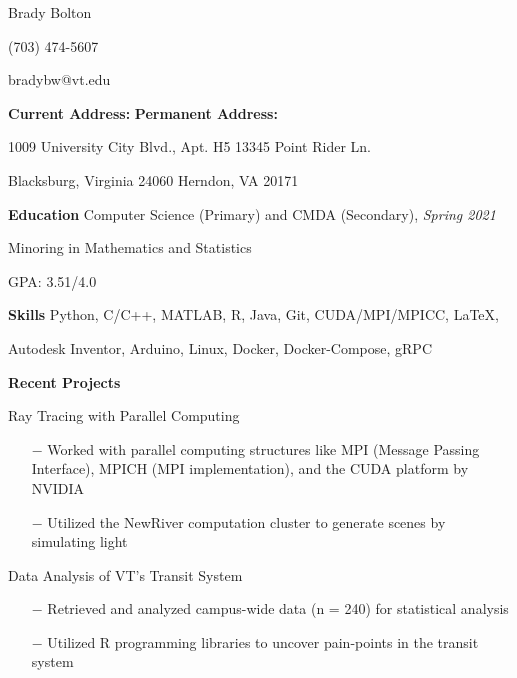 \documentclass{article}
\begin{document}
	\begin{center}
	
		\huge{Brady Bolton}
		
		\large{(703) 474-5607}
		
		\large{bradybw@vt.edu}
	
	\end{center}

\textbf{Current Address:} \hfill \textbf{Permanent Address:}

1009 University City Blvd., Apt. H5 \hfill 13345 Point Rider Ln.

Blacksburg, Virginia 24060 \hfill Herndon, VA 20171

\vline

\textbf{\large{Education}} \quad Computer Science (Primary) and CMDA (Secondary), \textit{Spring 2021}

\qquad \qquad \qquad \hspace{10pt} Minoring in Mathematics and Statistics

\qquad \qquad \qquad \hspace{10pt} GPA: 3.51/4.0

\vline

\textbf{\large{Skills}} \qquad \qquad Python, C/C++, MATLAB, R, Java, Git, CUDA/MPI/MPICC, \LaTeX, 

\qquad \qquad \qquad \hspace{10pt} Autodesk Inventor, Arduino, Linux, Docker, Docker-Compose, gRPC

\vline

\textbf{\large{Recent Projects}} 

\vspace{5pt}

{\setlength{\leftskip}{15pt}
	{\selectfont Ray Tracing with Parallel Computing}
	\vspace{-5pt}
	\begin{itemize}
		\setlength{\leftskip}{15pt}
		\setlength\itemsep{-0.5em}
		\item[$-$] Worked with parallel computing structures like MPI (Message Passing Interface), MPICH (MPI implementation), and the CUDA platform by NVIDIA
		\item[$-$] Utilized the NewRiver computation cluster to generate scenes by simulating light
	\end{itemize}
	
	{\selectfont Data Analysis of VT’s Transit System}
	\vspace{-5pt}
	\begin{itemize}
		\setlength{\leftskip}{15pt}
		\setlength\itemsep{-0.5em}
		\item[$-$] Retrieved and analyzed campus-wide data (n = 240) for statistical analysis
		\item[$-$] Utilized R programming libraries to uncover pain-points in the transit system
	\end{itemize}
}
\setlength{\leftskip}{0cm}
\end{document}
